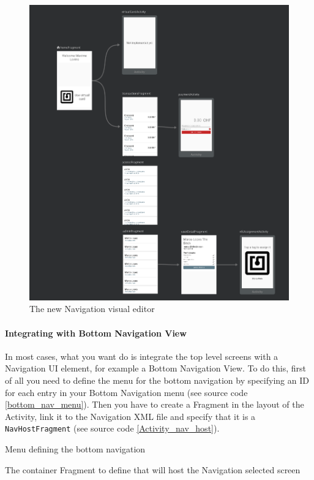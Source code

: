 \documentclass[twoside, openright,11pt,a4paper]{book}
\newenvironment{code}{\captionsetup{type=listing}}{}
\begin{document}
\begin{figure}[H]
\begin{center}
	\includegraphics[width=.8\textwidth]{assets/navEditor}
	\caption[Navigation visual editor]{The new Navigation visual editor}
	\label{navigation_editor}
\end{center}
\end{figure}

\paragraph{Integrating with Bottom Navigation View}
In most cases, what you want do is integrate the top level screens with a Navigation UI element, for example a Bottom Navigation View\cite{android:doc:material:bottom_nav}. To do this, first of all you need to define the menu for the bottom navigation by specifying an ID for each entry in your Bottom Navigation menu (see source code \ref{bottom_nav_menu}). Then you have to create a Fragment in the layout of the Activity, link it to the Navigation XML file and specify that it is a \verb+NavHostFragment+ (see source code \ref{Activity_nav_host}).
\begin{code}
	\caption{Menu defining the bottom navigation}
	\label{bottom_nav_menu}
\end{code}

\begin{code}
	\caption{The container Fragment to define that will host the Navigation selected screen}
	\label{Activity_nav_host}
\end{code}
\end{document}
